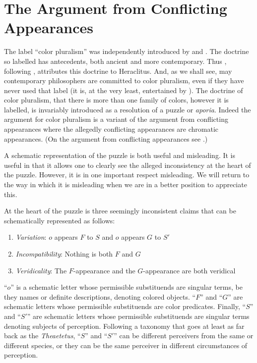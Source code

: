 \documentclass[12pt]{article}
\begin{document}
\section{The Argument from Conflicting Appearances} %
\label{sec:the_argument_from_conflicting_appearances}

The label ``color pluralism'' was independently introduced by \citet{Mizrahi:2006zr} and \citet{Kalderon:2006tg}. The doctrine so labelled has antecedents, both ancient and more contemporary. Thus \citet{Kalderon:2006tg}, following \citet{Burnyeat:1979mv}, attributes this doctrine to Heraclitus. And, as we shall see, may contemporary philosophers are committed to color pluralism, even if they have never used that label (it is, at the very least, entertained by \citealt{Harman:2001mv}). The doctrine of color pluralism, that there is more than one family of colors, however it is labelled, is invariably introduced as a resolution of a puzzle or \emph{aporia}. Indeed the argument for color pluralism is a variant of the argument from conflicting appearances where the allegedly conflicting appearances are chromatic appearances. (On the argument from conflicting appearances see \citealt{Burnyeat:1979mv,Annas:1985fk}.)

A schematic representation of the puzzle is both useful and misleading. It is useful in that it allows one to clearly see the alleged inconsistency at the heart of the puzzle. However, it is in one important respect misleading. We will return to the way in which it is misleading when we are in a better position to appreciate this.

At the heart of the puzzle is three seemingly inconsistent claims that can be schematically represented as follows:
\begin{enumerate}
	\item \emph{Variation}: \( o \) appears \( F \) to \( S \) and \( o \) appears \( G \) to \( S' \)
	\item \emph{Incompatibility}: Nothing is both \( F \) and \( G \)
	\item \emph{Veridicality}: The \( F \)-appearance and the \( G \)-appearance are both veridical
\end{enumerate}
``\( o \)'' is a schematic letter whose permissible substituends are singular terms, be they names or definite descriptions, denoting colored objects. ``\( F \)'' and ``\( G \)'' are schematic letters whose permissible substituends are color predicates. Finally, ``\( S \)'' and ``\( S' \)'' are schematic letters whose permissible substituends are singular terms denoting subjects of perception. Following a taxonomy that goes at least as far back as the \emph{Theaetetus}, ``\( S \)'' and ``\( S' \)'' can be different perceivers from the same or different species, or they can be the same perceiver in different circumstances of perception.
\end{document}
